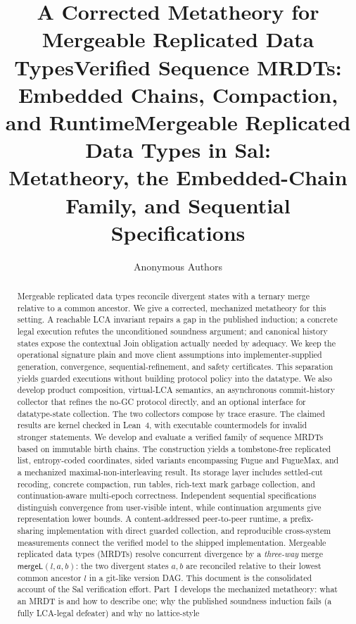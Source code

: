\documentclass[11pt]{article}
\title{\bfseries A Corrected Metatheory for\\
  \large Mergeable Replicated Data Types}
\title{\bfseries Verified Sequence MRDTs:\\
  \large Embedded Chains, Compaction, and Runtime}
\title{\bfseries Mergeable Replicated Data Types in Sal:\\
  \large Metatheory, the Embedded-Chain Family, and Sequential Specifications}
\author{Anonymous Authors}
\date{}
\newcommand{\mergeL}{\mathsf{mergeL}}
\begin{document}
\maketitle
\sloppy

\begin{abstract}
\noindent
\ifdefined\salPaperA
Mergeable replicated data types reconcile divergent states with a ternary
merge relative to a common ancestor. We give a corrected, mechanized
metatheory for this setting. A reachable LCA invariant repairs a gap in the
published induction; a concrete legal execution refutes the unconditioned
soundness argument; and canonical history states expose the contextual Join
obligation actually needed by adequacy. We keep the operational signature
plain and move client assumptions into implementer-supplied generation,
convergence, sequential-refinement, and safety certificates. This separation
yields guarded executions without building protocol policy into the datatype.
We also develop product composition, virtual-LCA semantics, an asynchronous
commit-history collector that refines the no-GC protocol directly, and an
optional interface for datatype-state collection. The two collectors compose
by trace erasure.
The claimed results are kernel checked in Lean~4, with executable
countermodels for invalid stronger statements.
\else\ifdefined\salPaperB
We develop and evaluate a verified family of sequence MRDTs based on immutable
birth chains. The construction yields a tombstone-free replicated list,
entropy-coded coordinates, sided variants encompassing Fugue and FugueMax,
and a mechanized maximal-non-interleaving result. Its storage layer includes
settled-cut recoding, concrete compaction, run tables, rich-text mark garbage
collection, and continuation-aware multi-epoch correctness. Independent
sequential specifications distinguish convergence from user-visible intent,
while continuation arguments give representation lower bounds. A
content-addressed peer-to-peer runtime, a prefix-sharing implementation with
direct guarded collection, and reproducible cross-system measurements connect
the verified model to the shipped implementation.
\else
Mergeable replicated data types (MRDTs) resolve concurrent divergence by
a \emph{three-way} merge $\mergeL(l,a,b)$: the two divergent states
$a,b$ are reconciled relative to their lowest common ancestor $l$ in a
git-like version DAG. This document is the consolidated account of the
Sal verification effort. Part~I develops the mechanized metatheory: what
an MRDT is and how to describe one; why the published soundness
induction fails (a fully LCA-legal defeater) and why no lattice-style

\end{abstract}
\end{document}
